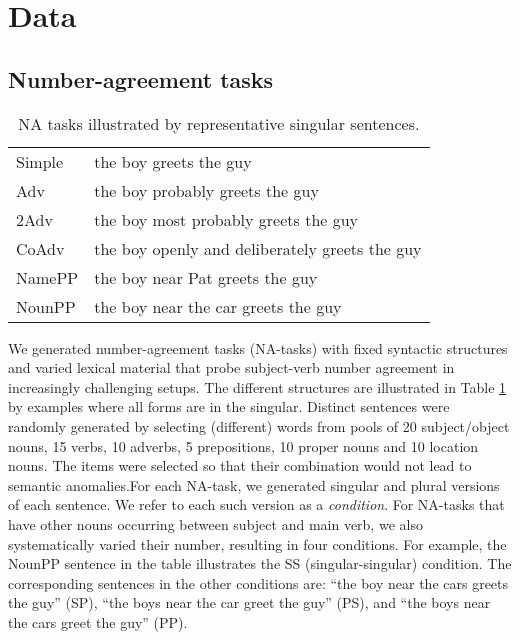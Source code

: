 \section{Data}
\subsection{Number-agreement tasks}

\begin{table}[tb]
  \centering
  \begin{footnotesize}
  \begin{tabular}{l@{\hskip1pt}l}
    \B Simple & the boy greets the guy\\
    \B Adv & the boy probably greets the guy\\
    \B 2Adv & the boy most probably greets the guy\\
    \B CoAdv &  the boy openly and deliberately greets the guy\\
    \B NamePP & the boy near Pat greets the guy\\
    \B NounPP & the boy near the car greets the guy\\
  \end{tabular}
  \end{footnotesize}
  \caption{NA tasks illustrated by representative
    singular sentences.}
  \label{tab:data-sets}
\end{table}

We generated number-agreement tasks (NA-tasks) with fixed syntactic
structures and varied lexical material that probe subject-verb number
agreement in increasingly challenging setups. The different structures
are illustrated in Table \ref{tab:data-sets} by examples where all
forms are in the singular. Distinct sentences were randomly generated
by selecting (different) words from pools of 20 subject/object nouns,
15 verbs, 10 adverbs, 5 prepositions, 10 proper nouns and 10 location
nouns. The items were selected so that their combination would not
lead to semantic anomalies.For each NA-task, we generated singular and
plural versions of each sentence. We refer to each such version as a
\textit{condition}. For NA-tasks that have other nouns occurring between
subject and main verb, we also systematically varied their number,
resulting in four conditions. For example, the NounPP sentence in the
table illustrates the SS (singular-singular) condition. The
corresponding sentences in the other conditions are: ``the boy near
the cars greets the guy'' (SP), ``the boys near the car greet the
guy'' (PS), and ``the boys near the cars greet the guy'' (PP).


